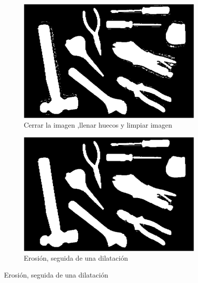\documentclass[a4paper, 11pt]{article}
\begin{document}
\begin{figure}[h]
  \centering
  \begin{subfigure}{0.5\linewidth}
    \includegraphics[width=\linewidth]{paso5} 
    \caption{Cerrar la imagen ,llenar huecos y limpiar imagen}
    \label{fig:1a}
  \end{subfigure}\hfill
  \begin{subfigure}{0.5\linewidth}
    \includegraphics[width=\linewidth]{paso6}
    \caption{Erosión, seguida de una dilatación }
    \label{fig:1a}
  \end{subfigure}
  

\end{figure}
\end{document}
